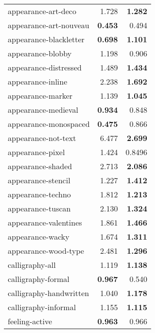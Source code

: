 \begin{longtable}{|l|r|r|}
appearance-art-deco       & 1.728                   & \textbf{1.282}      \\
appearance-art-nouveau    & \textbf{0.453}          & 0.494               \\
appearance-blackletter    & \textbf{0.698}          & \textbf{1.101}      \\
appearance-blobby         & 1.198                   & 0.906               \\
appearance-distressed     & 1.489                   & \textbf{1.434}      \\
appearance-inline         & 2.238                   & \textbf{1.692}      \\
appearance-marker         & 1.139                   & \textbf{1.045}      \\
appearance-medieval       & \textbf{0.934}          & 0.848               \\
appearance-monospaced     & \textbf{0.475}          & 0.866               \\
appearance-not-text       & 6.477                   & \textbf{2.699}      \\
appearance-pixel          & 1.424                   & 0.8496               \\
appearance-shaded         & 2.713                   & \textbf{2.086}      \\
appearance-stencil        & 1.227                   & \textbf{1.412}      \\
appearance-techno         & 1.812                   & \textbf{1.213}      \\
appearance-tuscan         & 2.130                   & \textbf{1.324}      \\
appearance-valentines     & 1.861                   & \textbf{1.466}      \\
appearance-wacky          & 1.674                   & \textbf{1.311}      \\
appearance-wood-type      & 2.481                   & \textbf{1.296}      \\
calligraphy-all           & 1.119                   & \textbf{1.138}      \\
calligraphy-formal        & \textbf{0.967}          & 0.540               \\
calligraphy-handwritten   & 1.040                   & \textbf{1.178}      \\
calligraphy-informal      & 1.155                   & \textbf{1.115}      \\
feeling-active            & \textbf{0.963}          & 0.966               \\

\end{longtable}
